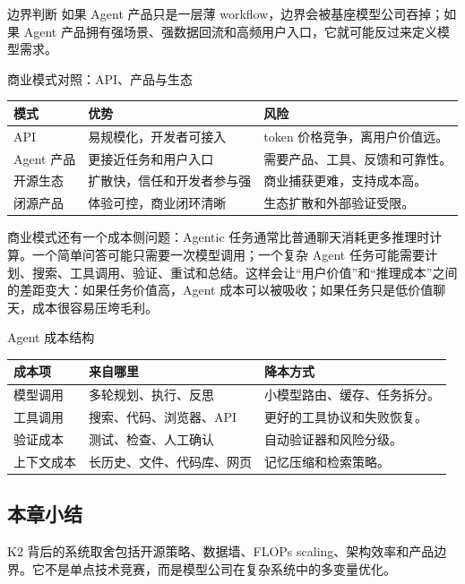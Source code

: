 \begin{importantbox}{边界判断}
如果 Agent 产品只是一层薄 workflow，边界会被基座模型公司吞掉；如果 Agent 产品拥有强场景、强数据回流和高频用户入口，它就可能反过来定义模型需求。
\end{importantbox}

\begin{knowledgebox}{商业模式对照：API、产品与生态}
\begin{tabularx}{\textwidth}{p{}p{}X}
\toprule
模式 & 优势 & 风险 \\
\midrule
API & 易规模化，开发者可接入 & token 价格竞争，离用户价值远。 \\
Agent 产品 & 更接近任务和用户入口 & 需要产品、工具、反馈和可靠性。 \\
开源生态 & 扩散快，信任和开发者参与强 & 商业捕获更难，支持成本高。 \\
闭源产品 & 体验可控，商业闭环清晰 & 生态扩散和外部验证受限。 \\
\bottomrule
\end{tabularx}
\end{knowledgebox}

商业模式还有一个成本侧问题：Agentic 任务通常比普通聊天消耗更多推理时计算。一个简单问答可能只需要一次模型调用；一个复杂 Agent 任务可能需要计划、搜索、工具调用、验证、重试和总结。这样会让“用户价值”和“推理成本”之间的差距变大：如果任务价值高，Agent 成本可以被吸收；如果任务只是低价值聊天，成本很容易压垮毛利。

\begin{knowledgebox}{Agent 成本结构}
\begin{tabularx}{\textwidth}{p{}p{}X}
\toprule
成本项 & 来自哪里 & 降本方式 \\
\midrule
模型调用 & 多轮规划、执行、反思 & 小模型路由、缓存、任务拆分。 \\
工具调用 & 搜索、代码、浏览器、API & 更好的工具协议和失败恢复。 \\
验证成本 & 测试、检查、人工确认 & 自动验证器和风险分级。 \\
上下文成本 & 长历史、文件、代码库、网页 & 记忆压缩和检索策略。 \\
\bottomrule
\end{tabularx}
\end{knowledgebox}

\subsection{本章小结}

K2 背后的系统取舍包括开源策略、数据墙、FLOPs scaling、架构效率和产品边界。它不是单点技术竞赛，而是模型公司在复杂系统中的多变量优化。

